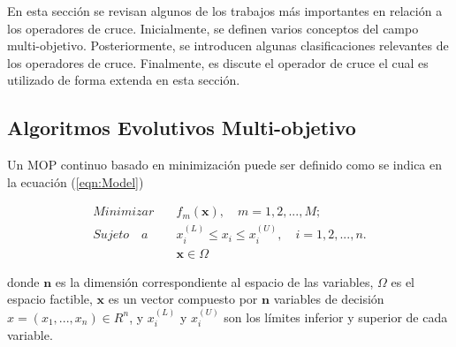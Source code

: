 En esta sección se revisan algunos de los trabajos más importantes en relación a los operadores de cruce.
%
%
Inicialmente, se definen varios conceptos del campo multi-objetivo.
%
Posteriormente, se introducen algunas clasificaciones relevantes de los operadores de cruce.
%
Finalmente, es discute el operador de cruce \SBX{} el cual es utilizado de forma extenda en esta sección.

\subsection{Algoritmos Evolutivos Multi-objetivo}


Un MOP continuo basado en minimización puede ser definido como se indica en la ecuación (\ref{eqn:Model})

\begin{equation}
 \label{eqn:Model}
   \begin{split}
    Minimizar \quad & f_m(\mathbf{x}), \quad m = 1, 2,...,M;\\
   Sujeto \quad a \quad &  x_i^{(L)} \leq x_i \leq x_i^{(U)}, \quad i=1,2,..., n. \\
   & \mathbf{x} \in \Omega
   \end{split}
\end{equation}

donde $\mathbf{n}$ es la dimensión correspondiente al espacio de las variables, $\Omega$ es el espacio factible, $\mathbf{x}$ es un vector compuesto por $\mathbf{n}$ variables de decisión $x=(x_1, ..., x_n) \in R^n$, y $x_i^{(L)}$ y $x_i^{(U)}$ son los límites inferior y superior de cada variable.      


